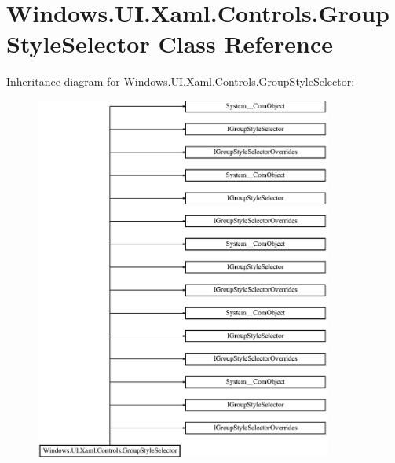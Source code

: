 \hypertarget{class_windows_1_1_u_i_1_1_xaml_1_1_controls_1_1_group_style_selector}{}\section{Windows.\+U\+I.\+Xaml.\+Controls.\+Group\+Style\+Selector Class Reference}
\label{class_windows_1_1_u_i_1_1_xaml_1_1_controls_1_1_group_style_selector}
Inheritance diagram for Windows.\+U\+I.\+Xaml.\+Controls.\+Group\+Style\+Selector\+:\begin{figure}[H]
\begin{center}
\leavevmode
\includegraphics[height=12.000000cm]{class_windows_1_1_u_i_1_1_xaml_1_1_controls_1_1_group_style_selector}
\end{center}
\end{figure}
